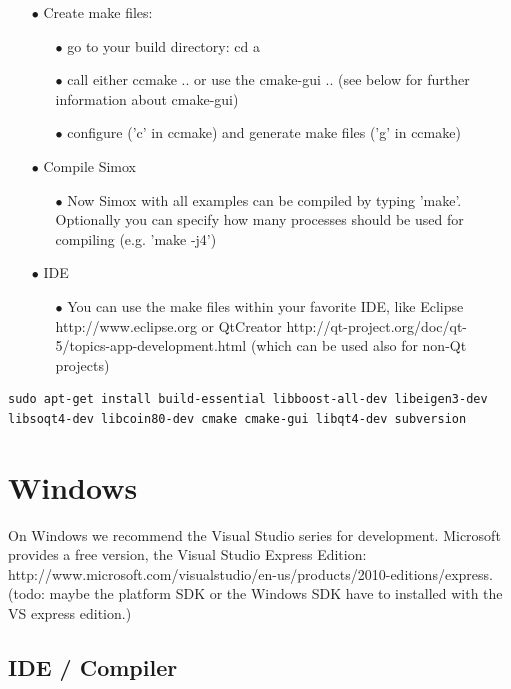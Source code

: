 \begin{itemize}
\begin{itemize}
\item[$\bullet$] Create make files: 
\begin{itemize}
\item[$\bullet$] go to your build directory: cd a
\item[$\bullet$] call either ccmake .. or use the cmake-gui .. (see below for further information about cmake-gui) 
\item[$\bullet$] configure ('c' in ccmake) and generate make files ('g' in ccmake) 
\end{itemize}
\item[$\bullet$] Compile Simox 
\begin{itemize}
\item[$\bullet$] Now Simox with all examples can be compiled by typing 'make'. Optionally you can specify how many processes should be used for compiling (e.g. 'make -j4') 
\end{itemize}
\item[$\bullet$] IDE 
\begin{itemize}
\item[$\bullet$] You can use the make files within your favorite IDE, like Eclipse http://www.eclipse.org or QtCreator http://qt-project.org/doc/qt-5/topics-app-development.html (which can be used also for non-Qt projects) 
\end{itemize}
\end{itemize}
\end{itemize}
\begin{lstlisting}
sudo apt-get install build-essential libboost-all-dev libeigen3-dev libsoqt4-dev libcoin80-dev cmake cmake-gui libqt4-dev subversion
\end{lstlisting}
\section{Windows}
On Windows we recommend the Visual Studio series for development. Microsoft provides a free version, the Visual Studio Express Edition: http://www.microsoft.com/visualstudio/en-us/products/2010-editions/express. (todo: maybe the platform SDK or the Windows SDK have to installed with the VS express edition.) 
\subsection{IDE / Compiler}
